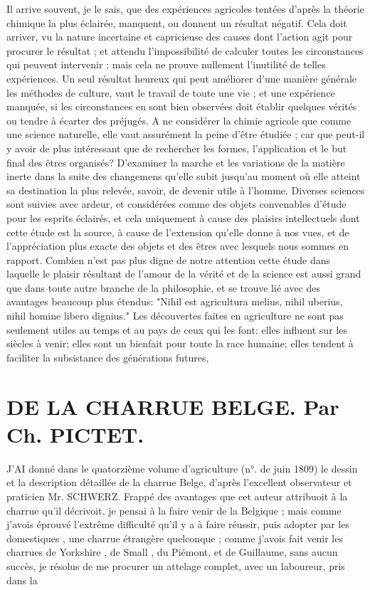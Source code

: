Il arrive souvent, je le sais, que des expériences agricoles tentées d'après la théorie chimique la plus éclairée, manquent, ou donnent un résultat négatif. Cela doit arriver, vu la nature incertaine et capricieuse des causes dont l'action agit pour procurer le résultat ; et attendu l'impossibilité de calculer toutes les circonstances qui peuvent intervenir ; mais cela ne prouve nullement l'inutilité de telles expériences. Un seul résultat heureux qui peut améliorer d'une manière générale les méthodes de culture, vaut le travail de toute une vie ; et une expérience manquée, si les circonstances en sont bien observées doit établir quelques vérités ou tendre à écarter des préjugés.
A ne considérer la chimie agricole que comme une science naturelle, elle vaut assurément la peine d'être étudiée ; car que peut-il y avoir de plus intéressant que de\setcounter{page}{358} rechercher les formes, l'application et le but final des êtres organisés? D'examiner la marche et les variations de la matière inerte dans la suite des changemens qu'elle subit jusqu'au moment où elle atteint sa destination la plus relevée, savoir, de devenir utile à l'homme.
Diverses sciences sont suivies avec ardeur, et considérées comme des objets convenables d'étude pour les esprits éclairés, et cela uniquement à cause des plaisirs intellectuels dont cette étude est la source, à cause de l'extension qu'elle donne à nos vues, et de l'appréciation plus exacte des objets et des êtres avec lesquels nous sommes en rapport. Combien n'est pas plus digne de notre attention cette étude dans laquelle le plaisir résultant de l'amour de la vérité et de la science est aussi grand que dans toute autre branche de la philosophie, et se trouve lié avec des avantages beaucoup plus étendus: "Nihil est agricultura melius, nihil uberius, nihil homine libero dignius."
Les découvertes faites en agriculture ne sont pas seulement utiles au temps et au pays de ceux qui les font: elles influent sur les siècles à venir; elles sont un bienfait pour toute la race humaine; elles tendent à faciliter la subsistance des générations futures,\setcounter{page}{359} \section{DE LA CHARRUE BELGE. Par Ch. PICTET.}
J'AI donné dans le quatorzième volume d'agriculture (n°. de juin 1809) le dessin et la description détaillée de la charrue Belge, d'après l'excellent observateur et praticien Mr. SCHWERZ. Frappé des avantages que cet auteur attribuoit à la charrue qu'il décrivoit, je pensai à la faire venir de la Belgique ; mais comme j'avois éprouvé l'extrême difficulté qu'il y a à faire réussir, puis adopter par les domestiques , une charrue étrangère quelconque ; comme j'avois fait venir les charrues de Yorkshire , de Small , du Piémont, et de Guillaume, sans aucun succès, je résolus de me procurer un attelage complet, avec un laboureur, pris dans la
